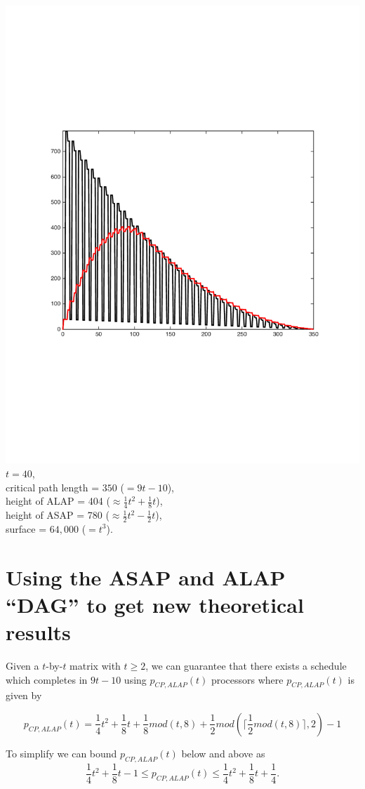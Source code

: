 \begin{frame}

\includegraphics[width=.70\textwidth]{matlab_files/compare_ALAP_ASAP.pdf}\\
\scriptsize
$t=40$, \\
critical path length = $350$ ($= 9t-10$),\\
height of ALAP = 404 ($\approx \frac{1}{4}t^2 +\frac{1}{8}t$),\\
height of ASAP = 780 ($\approx \frac{1}{2}t^2 -\frac{1}{2}t$),\\
surface = $64,000$ ($=t^3$).


\end{frame}

\section{Using the ASAP and ALAP ``DAG'' to get new theoretical results}



\begin{frame}

Given a $t$-by-$t$ matrix with $t\geq2$,
we can guarantee that there exists a schedule which completes in $9t-10$
using $p_{CP,ALAP}(t)$ processors where $p_{CP,ALAP}(t)$ is given by

$$
p_{CP,ALAP}(t) = 
\frac{1}{4}t^2 +\frac{1}{8}t
 +\frac{1}{8}mod(t,8) + \frac{1}{2} mod( \lceil \frac{1}{2} mod(t,8) \rceil ,2)-1
$$

To simplify we can bound $p_{CP,ALAP}(t)$ below and above as
$$
\frac{1}{4}t^2 +\frac{1}{8}t -1
\leq  p_{CP,ALAP}(t) \leq 
\frac{1}{4}t^2 +\frac{1}{8}t + \frac{1}{4}.
$$



\end{frame}



